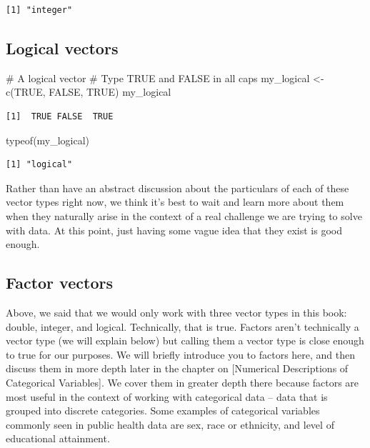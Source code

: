 \documentclass[
  letterpaper,
  DIV=11,
  numbers=noendperiod]{scrreprt}
\newenvironment{Shaded}{\begin{snugshade}}{\end{snugshade}}
\newcommand{\CommentTok}[1]{\textcolor[rgb]{0.37,0.37,0.37}{#1}}
\newcommand{\ConstantTok}[1]{\textcolor[rgb]{0.56,0.35,0.01}{#1}}
\newcommand{\FunctionTok}[1]{\textcolor[rgb]{0.28,0.35,0.67}{#1}}
\newcommand{\NormalTok}[1]{\textcolor[rgb]{0.00,0.23,0.31}{#1}}
\newcommand{\OtherTok}[1]{\textcolor[rgb]{0.00,0.23,0.31}{#1}}
\begin{document}
\begin{verbatim}
[1] "integer"
\end{verbatim}

\subsection{Logical vectors}\label{logical-vectors}

\begin{Shaded}
\begin{Highlighting}[]
\CommentTok{\# A logical vector}
\CommentTok{\# Type TRUE and FALSE in all caps}
\NormalTok{my\_logical }\OtherTok{\textless{}{-}} \FunctionTok{c}\NormalTok{(}\ConstantTok{TRUE}\NormalTok{, }\ConstantTok{FALSE}\NormalTok{, }\ConstantTok{TRUE}\NormalTok{)}
\NormalTok{my\_logical}
\end{Highlighting}
\end{Shaded}

\begin{verbatim}
[1]  TRUE FALSE  TRUE
\end{verbatim}

\begin{Shaded}
\begin{Highlighting}[]
\FunctionTok{typeof}\NormalTok{(my\_logical)}
\end{Highlighting}
\end{Shaded}

\begin{verbatim}
[1] "logical"
\end{verbatim}

Rather than have an abstract discussion about the particulars of each of
these vector types right now, we think it's best to wait and learn more
about them when they naturally arise in the context of a real challenge
we are trying to solve with data. At this point, just having some vague
idea that they exist is good enough.

\subsection{Factor vectors}\label{factor-vectors}

Above, we said that we would only work with three vector types in this
book: double, integer, and logical. Technically, that is true. Factors
aren't technically a vector type (we will explain below) but calling
them a vector type is close enough to true for our purposes. We will
briefly introduce you to factors here, and then discuss them in more
depth later in the chapter on {[}Numerical Descriptions of Categorical
Variables{]}. We cover them in greater depth there because factors are
most useful in the context of working with categorical data -- data that
is grouped into discrete categories. Some examples of categorical
variables commonly seen in public health data are sex, race or
ethnicity, and level of educational attainment.
\end{document}
